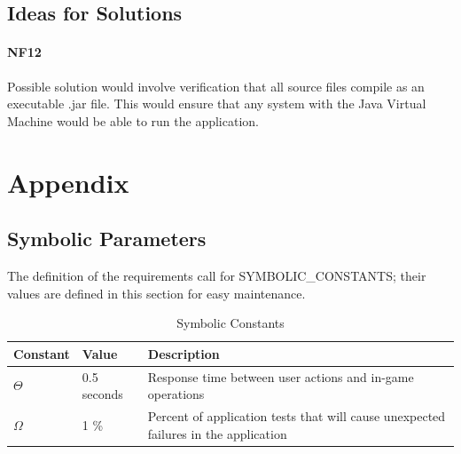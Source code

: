 \documentclass[12pt, titlepage]{article}
\begin{document}
\subsection{Ideas for Solutions}
\paragraph{NF12}
Possible solution would involve verification that all source files compile as an executable .jar file. This would ensure that any system with the Java Virtual Machine would be able to run the application.

\newpage





\newpage

\section{Appendix}

\subsection{Symbolic Parameters}

The definition of the requirements call for SYMBOLIC\_CONSTANTS; their values are defined in this section for easy maintenance.

\begin{table}[H]
\caption{Symbolic Constants} \label{tab:constants}
\begin{tabularx}{\textwidth}{p{3cm}p{2cm}X}
\toprule {\bf Constant} & {\bf Value} & {\bf Description}\\
\midrule
$\Theta$ & 0.5 seconds & Response time between user actions and in-game operations\\
$\Omega$ & 1 \% & Percent of application tests that will cause unexpected failures in the application\\
\bottomrule
\end{tabularx}
\end{table}
\end{document}
